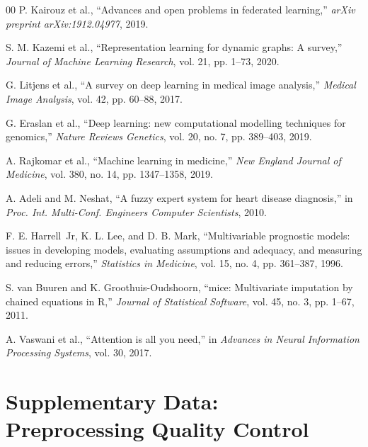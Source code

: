\documentclass[journal,twoside,web]{ieeecolor}
\begin{document}
\begin{thebibliography}{00}
P. Kairouz et al., ``Advances and open problems in federated learning,'' \textit{arXiv preprint arXiv:1912.04977}, 2019.

S. M. Kazemi et al., ``Representation learning for dynamic graphs: A survey,'' \textit{Journal of Machine Learning Research}, vol. 21, pp. 1--73, 2020.

G. Litjens et al., ``A survey on deep learning in medical image analysis,'' \textit{Medical Image Analysis}, vol. 42, pp. 60--88, 2017.

G. Eraslan et al., ``Deep learning: new computational modelling techniques for genomics,'' \textit{Nature Reviews Genetics}, vol. 20, no. 7, pp. 389--403, 2019.

A. Rajkomar et al., ``Machine learning in medicine,'' \textit{New England Journal of Medicine}, vol. 380, no. 14, pp. 1347--1358, 2019.

A. Adeli and M. Neshat, ``A fuzzy expert system for heart disease diagnosis,'' in \textit{Proc. Int. Multi-Conf. Engineers Computer Scientists}, 2010.

F. E. Harrell~Jr, K. L. Lee, and D. B. Mark, ``Multivariable prognostic models: issues in developing models, evaluating assumptions and adequacy, and measuring and reducing errors,'' \textit{Statistics in Medicine}, vol. 15, no. 4, pp. 361--387, 1996.

S. van Buuren and K. Groothuis-Oudshoorn, ``mice: Multivariate imputation by chained equations in R,'' \textit{Journal of Statistical Software}, vol. 45, no. 3, pp. 1--67, 2011.

A. Vaswani et al., ``Attention is all you need,'' in \textit{Advances in Neural Information Processing Systems}, vol. 30, 2017.

\end{thebibliography}

\clearpage
\appendix

\section{Supplementary Data: Preprocessing Quality Control}

\setcounter{figure}{0}
\renewcommand{\thefigure}{A\arabic{figure}}
\end{document}
